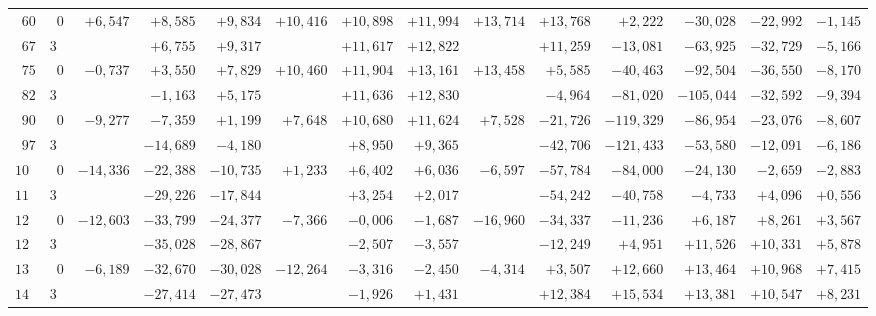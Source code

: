 \begin{landscape}
\begin{longtable}{@{}rr|r|r|r|r|r|r|r|r|r|r|r|r@{}}
\(60\) & \(0\) & \(+6{,}547\) & \(+8{,}585\) & \(+9{,}834\) & \(+10{,}416\) & \(+10{,}898\) & \(+11{,}994\) & \(+13{,}714\) & \(+13{,}768\) & \(+2{,}222\) & \(-30{,}028\) & \(-22{,}992\) & \(-1{,}145\)\\
\(67\) & \(30\) &  & \(+6{,}755\) & \(+9{,}317\) &  & \(+11{,}617\) & \(+12{,}822\) &  & \(+11{,}259\) & \(-13{,}081\) & \(-63{,}925\) & \(-32{,}729\) & \(-5{,}166\)\\
\(75\) & \(0\) & \(-0{,}737\) & \(+3{,}550\) & \(+7{,}829\) & \(+10{,}460\) & \(+11{,}904\) & \(+13{,}161\) & \(+13{,}458\) & \(+5{,}585\) & \(-40{,}463\) & \(-92{,}504\) & \(-36{,}550\) & \(-8{,}170\)\\
\(82\) & \(30\) &  & \(-1{,}163\) & \(+5{,}175\) &  & \(+11{,}636\) & \(+12{,}830\) &  & \(-4{,}964\) & \(-81{,}020\) & \(-105{,}044\) & \(-32{,}592\) & \(-9{,}394\)\\[2pt]
\(90\) & \(0\) & \(-9{,}277\) & \(-7{,}359\) & \(+1{,}199\) & \(+7{,}648\) & \(+10{,}680\) & \(+11{,}624\) & \(+7{,}528\) & \(-21{,}726\) & \(-119{,}329\) & \(-86{,}954\) & \(-23{,}076\) & \(-8{,}607\)\\
\(97\) & \(30\) &  & \(-14{,}689\) & \(-4{,}180\) &  & \(+8{,}950\) & \(+9{,}365\) &  & \(-42{,}706\) & \(-121{,}433\) & \(-53{,}580\) & \(-12{,}091\) & \(-6{,}186\)\\
\(105\) & \(0\) & \(-14{,}336\) & \(-22{,}388\) & \(-10{,}735\) & \(+1{,}233\) & \(+6{,}402\) & \(+6{,}036\) & \(-6{,}597\) & \(-57{,}784\) & \(-84{,}000\) & \(-24{,}130\) & \(-2{,}659\) & \(-2{,}883\)\\
\(112\) & \(30\) &  & \(-29{,}226\) & \(-17{,}844\) &  & \(+3{,}254\) & \(+2{,}017\) &  & \(-54{,}242\) & \(-40{,}758\) & \(-4{,}733\) & \(+4{,}096\) & \(+0{,}556\)\\[2pt]
\(120\) & \(0\) & \(-12{,}603\) & \(-33{,}799\) & \(-24{,}377\) & \(-7{,}366\) & \(-0{,}006\) & \(-1{,}687\) & \(-16{,}960\) & \(-34{,}337\) & \(-11{,}236\) & \(+6{,}187\) & \(+8{,}261\) & \(+3{,}567\)\\
\(127\) & \(30\) &  & \(-35{,}028\) & \(-28{,}867\) &  & \(-2{,}507\) & \(-3{,}557\) &  & \(-12{,}249\) & \(+4{,}951\) & \(+11{,}526\) & \(+10{,}331\) & \(+5{,}878\)\\
\(135\) & \(0\) & \(-6{,}189\) & \(-32{,}670\) & \(-30{,}028\) & \(-12{,}264\) & \(-3{,}316\) & \(-2{,}450\) & \(-4{,}314\) & \(+3{,}507\) & \(+12{,}660\) & \(+13{,}464\) & \(+10{,}968\) & \(+7{,}415\)\\
\(142\) & \(30\) &  & \(-27{,}414\) & \(-27{,}473\) &  & \(-1{,}926\) & \(+1{,}431\) &  & \(+12{,}384\) & \(+15{,}534\) & \(+13{,}381\) & \(+10{,}547\) & \(+8{,}231\)\\[2pt]

\end{longtable}
\end{landscape}
